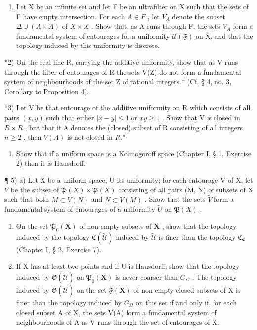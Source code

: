 \BourbakiExerciseGroup

\begin{enumerate}
\def\labelenumi{\arabic{enumi})}
\tightlist
\item
  Let X be an infinite set and let F be an ultrafilter on X such that the sets of F have empty intersection. For each \(A \in F\) , let \(V_{A}\) denote the subset \(\Delta \cup (A \times A)\) of \(X \times X\) . Show that, as A runs through F, the sets \(V_{A}\) form a fundamental system of entourages for a uniformity \(\mathcal{U}(\mathfrak{F})\) on X, and that the topology induced by this uniformity is discrete.
\end{enumerate}

*2) On the real line R, carrying the additive uniformity, show that as V runs through the filter of entourages of R the sets V(Z) do not form a fundamental system of neighbourhoods of the set Z of rational integers.* (Cf. § 4, no. 3, Corollary to Proposition 4).

*3) Let V be that entourage of the additive uniformity on R which consists of all pairs \((x, y)\) such that either \(|x - y| \leqslant 1\) or \(xy \geqslant 1\) . Show that V is closed in \(R \times R\) , but that if A denotes the (closed) subset of R consisting of all integers \(n \geqslant 2\) , then \(V(A)\) is not closed in \(R\).*

\begin{enumerate}
\def\labelenumi{\arabic{enumi})}
\setcounter{enumi}{3}
\tightlist
\item
  Show that if a uniform space is a Kolmogoroff space (Chapter I, § 1, Exercise 2) then it is Hausdorff.
\end{enumerate}

¶ 5) a) Let X be a uniform space, U its uniformity; for each entourage V of X, let \(\tilde{V}\) be the subset of \(\mathfrak{P}(X) \times \mathfrak{P}(X)\) consisting of all pairs (M, N) of subsets of X such that both \(M \subset V(N)\) and \(N \subset V(M)\) . Show that the sets \(\tilde{V}\) form a fundamental system of entourages of a uniformity \(\tilde{U}\) on \(\mathfrak{P}(X)\) .

\begin{enumerate}
\def\labelenumi{\alph{enumi})}
\setcounter{enumi}{1}
\item
  On the set \(\mathfrak{P}_{0}(\mathbf{X})\) of non-empty subsets of \(\mathbf{X}\) , show that the topology induced by the topology \(\mathfrak{C}(\tilde{\mathcal{U}})\) induced by \(\tilde{\mathcal{U}}\) is finer than the topology \(\mathfrak{C}_{\Phi}\) (Chapter I, § 2, Exercise 7).
\item
  If X has at least two points and if U is Hausdorff, show that the topology induced by \(\mathfrak{G}(\tilde{\mathcal{U}})\) on \(\mathfrak{P}_{0}(\mathbf{X})\) is never coarser than \(G_{\Omega}\) . The topology induced by \(\mathfrak{G}(\tilde{\mathcal{U}})\) on the set \(\mathfrak{F}(\mathbf{X})\) of non-empty closed subsets of X is finer than the topology induced by \(G_{\Omega}\) on this set if and only if, for each closed subset A of X, the sets V(A) form a fundamental system of neighbourhoods of A as V runs through the set of entourages of X.
\end{enumerate}


